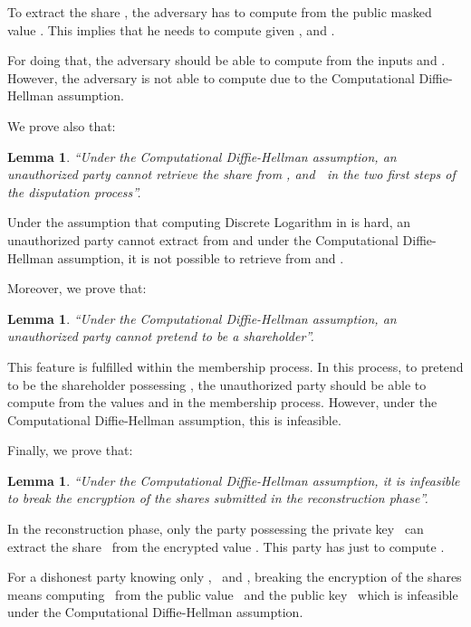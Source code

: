 \documentclass[submission,copyright,creativecommons]{eptcs}
\newtheorem{lemma}[theorem]{Lemma}
\newenvironment{proof}[1][Proof]{\begin{trivlist}
\item[\hskip \labelsep {\bfseries #1}]}{\end{trivlist}}
\begin{document}
\begin{proof}
To extract the share , the adversary has to compute  from the
public masked value . This implies
that he needs to compute   given 
,  and . 

For doing that, the adversary
should be able to compute  from the inputs  and . However, the adversary is not able to compute  due to the Computational Diffie-Hellman assumption.
\end{proof}

We prove also that:

\begin{lemma}
\textquotedblleft Under the Computational Diffie-Hellman assumption, an unauthorized
party cannot retrieve the share  from , and \textbf{\ }in the two first steps of the
disputation process\textquotedblright .
\end{lemma}

\begin{proof}
Under the assumption that computing Discrete Logarithm in  is hard,
an unauthorized party cannot extract  from  and under the Computational Diffie-Hellman
assumption, it is not possible to retrieve  from and .
\end{proof}

Moreover, we prove that:

\begin{lemma}
\textquotedblleft Under the Computational Diffie-Hellman assumption, an
unauthorized party cannot pretend to be a shareholder\textquotedblright .
\end{lemma}

\begin{proof}
This feature is fulfilled within the membership process. In this process, to
pretend to be the shareholder possessing , the unauthorized party
should be able to compute  from the values 
and  in the membership process. However, under the Computational
Diffie-Hellman assumption, this is infeasible.
\end{proof}

Finally, we prove that:

\begin{lemma}
\textquotedblleft Under the Computational Diffie-Hellman assumption, it is
infeasible to break the encryption of the shares submitted in the
reconstruction phase\textquotedblright .
\end{lemma}

\begin{proof}
In the reconstruction phase, only the party possessing the private key \
can extract the share \ from the encrypted value . This party has just to compute . 

For a dishonest party knowing only , \ and , breaking the encryption of the shares means computing \ from the public value \ and the public key \ which is infeasible under the Computational Diffie-Hellman
assumption.
\end{proof}
\end{document}
